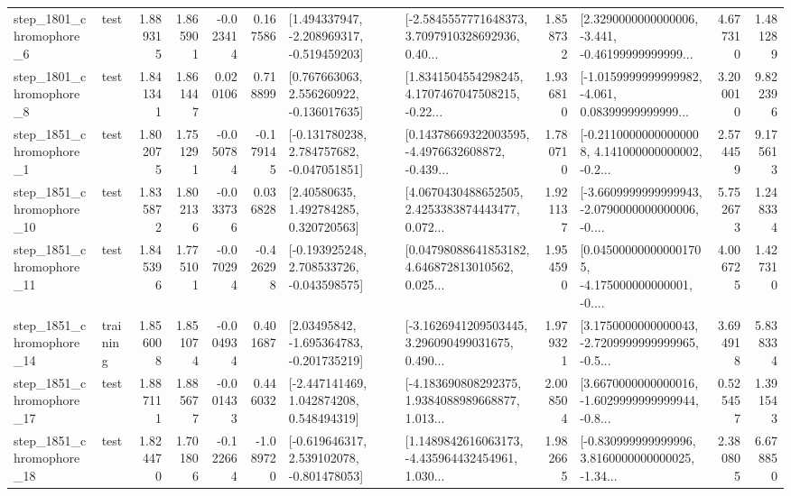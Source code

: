 \begin{tabular}{llrrrrllrlrr}
  step\_1801\_chromophore\_6 &      test &      1.889315 &    1.865901 &     -0.023414 &  0.167586 &   [1.494337947, -2.208969317, -0.519459203] &  [-2.5845557771648373, 3.7097910328692936, 0.40... &       1.858732 &  [2.3290000000000006, -3.441, -0.46199999999999... &            4.677310 &          1.481289 \\
  step\_1801\_chromophore\_8 &      test &      1.841341 &    1.861447 &      0.020106 &  0.718899 &    [0.767663063, 2.556260922, -0.136017635] &  [1.8341504554298245, 4.1707467047508215, -0.22... &       1.936810 &  [-1.0159999999999982, -4.061, 0.08399999999999... &            3.200010 &          9.822396 \\
  step\_1851\_chromophore\_1 &      test &      1.802075 &    1.751291 &     -0.050784 & -0.179145 &   [-0.131780238, 2.784757682, -0.047051851] &  [0.14378669322003595, -4.4976632608872, -0.439... &       1.780710 &  [-0.21100000000000008, 4.141000000000002, -0.2... &            2.574459 &          9.175613 \\
 step\_1851\_chromophore\_10 &      test &      1.835872 &    1.802136 &     -0.033736 &  0.036828 &      [2.40580635, 1.492784285, 0.320720563] &  [4.0670430488652505, 2.4253383874443477, 0.072... &       1.921137 &  [-3.6609999999999943, -2.0790000000000006, -0.... &            5.752673 &          1.248334 \\
 step\_1851\_chromophore\_11 &      test &      1.845396 &    1.775101 &     -0.070294 & -0.426298 &   [-0.193925248, 2.708533726, -0.043598575] &  [0.04798088641853182, 4.646872813010562, 0.025... &       1.954590 &  [0.045000000000001705, -4.175000000000001, -0.... &            4.006725 &          1.427310 \\
 step\_1851\_chromophore\_14 &  training &      1.856008 &    1.851074 &     -0.004934 &  0.401687 &    [2.03495842, -1.695364783, -0.201735219] &  [-3.1626941209503445, 3.296090499031675, 0.490... &       1.979321 &  [3.1750000000000043, -2.7209999999999965, -0.5... &            3.694918 &          5.838334 \\
 step\_1851\_chromophore\_17 &      test &      1.887111 &    1.885677 &     -0.001433 &  0.446032 &    [-2.447141469, 1.042874208, 0.548494319] &  [-4.183690808292375, 1.9384088989668877, 1.013... &       2.008504 &  [3.6670000000000016, -1.6029999999999944, -0.8... &            0.525457 &          1.391543 \\
 step\_1851\_chromophore\_18 &      test &      1.824470 &    1.701806 &     -0.122664 & -1.089720 &   [-0.619646317, 2.539102078, -0.801478053] &  [1.1489842616063173, -4.435964432454961, 1.030... &       1.982665 &  [-0.830999999999996, 3.8160000000000025, -1.34... &            2.380805 &          6.678850 \\

\end{tabular}

